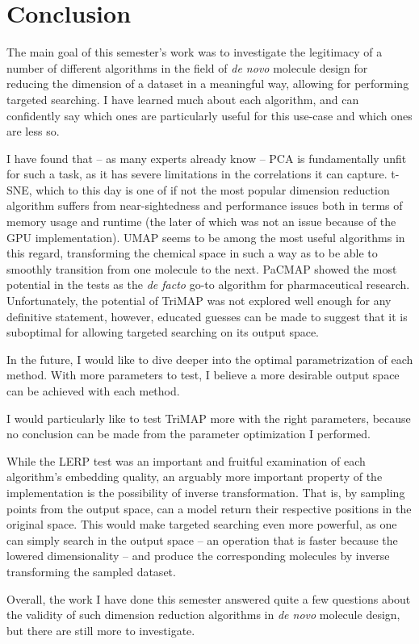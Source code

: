\chapter{Conclusion}\label{ch:conclusion}


The main goal of this semester's work was to investigate the legitimacy of a number of different algorithms in the field of \textit{de novo} molecule design for reducing the dimension of a dataset in a meaningful way, allowing for performing targeted searching. I have learned much about each algorithm, and can confidently say which ones are particularly useful for this use-case and which ones are less so.

I have found that -- as many experts already know -- PCA is fundamentally unfit for such a task, as it has severe limitations in the correlations it can capture. t-SNE, which to this day is one of if not the most popular dimension reduction algorithm suffers from near-sightedness and performance issues both in terms of memory usage and runtime (the later of which was not an issue because of the GPU implementation). UMAP seems to be among the most useful algorithms in this regard, transforming the chemical space in such a way as to be able to smoothly transition from one molecule to the next. PaCMAP showed the most potential in the tests as the \textit{de facto}  go-to algorithm for pharmaceutical research. Unfortunately, the potential of TriMAP was not explored well enough for any definitive statement, however, educated guesses can be made to suggest that it is suboptimal for allowing targeted searching on its output space.

In the future, I would like to dive deeper into the optimal parametrization of each method. With more parameters to test, I believe a more desirable output space can be achieved with each method. 

I would particularly like to test TriMAP more with the right parameters, because no conclusion can be made from the parameter optimization I performed. 

While the LERP test was an important and fruitful examination of each algorithm's embedding quality, an arguably more important property of the implementation is the possibility of inverse transformation. That is, by sampling points from the output space, can a model return their respective positions in the original space. This would make targeted searching even more powerful, as one can simply search in the output space -- an operation that is faster because the lowered dimensionality -- and produce the corresponding molecules by inverse transforming the sampled dataset.

Overall, the work I have done this semester answered quite a few questions about the validity of such dimension reduction algorithms in \textit{de novo} molecule design, but there are still more to investigate. 